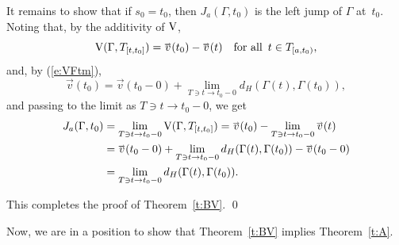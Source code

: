 \documentclass[preprint,12pt]{elsarticle}
\newcommand{\eq}[1]{\mbox{\rm(\ref{#1})}}
\newcommand{\nV}{\mbox{\rm V}}
\newcommand{\ori}[1]{{\scriptscriptstyle\overrightarrow{\mbox{$#1$}}}}
\begin{document}
\begin{pfBV}
It remains to show that if $s_0=t_0$, then $J_a(\Gamma,t_0)$ is the left jump of
$\Gamma$ at~$t_0$.\linebreak
Noting that, by the additivity of $\nV$,
  \begin{equation*}
\nV(\Gamma,T_{[t,t_0]})=\ori{v}(t_0)-\ori{v}(t)\quad\mbox{for all \,$t\in T_{[a,t_0)}$,}
  \end{equation*}
and, by \eq{e:VFtm},
  \begin{equation*}
\ori{v}(t_0)=\ori{v}(t_0-0)+\lim_{T\ni t\to t_0-0}d_H(\Gamma(t),\Gamma(t_0)),
  \end{equation*}
and passing to the limit as $T\ni t\to t_0-0$, we get
  \begin{align*}
J_a(\Gamma,t_0)&=\lim_{T\ni t\to t_0-0}\nV(\Gamma,T_{[t,t_0]})
  =\ori{v}(t_0)-\lim_{T\ni t\to t_0-0}\ori{v}(t)\\
&=\ori{v}(t_0-0)+\lim_{T\ni t\to t_0-0}d_H(\Gamma(t),\Gamma(t_0))-\ori{v}(t_0-0)\\
&=\lim_{T\ni t\to t_0-0}d_H(\Gamma(t),\Gamma(t_0)).
  \end{align*}

This completes the proof of Theorem~\ref{t:BV}.
\qed\end{pfBV}

Now, we are in a position to show that Theorem~\ref{t:BV} implies Theorem~\ref{t:A}.
\end{document}
